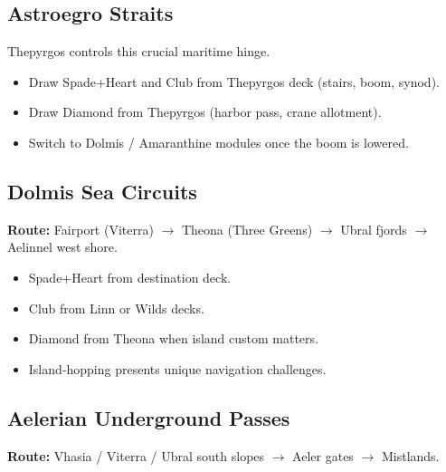 \subsection{Astroegro Straits}\label{subsec:astroegro_straits}

Thepyrgos controls this crucial maritime hinge.

\begin{itemize}
    \item Draw Spade+Heart and Club from Thepyrgos deck (stairs, boom, synod).
    \item Draw Diamond from Thepyrgos (harbor pass, crane allotment).
    \item Switch to Dolmis / Amaranthine modules once the boom is lowered.
\end{itemize}

\subsection{Dolmis Sea Circuits}\label{subsec:dolmis_circuits}

\textbf{Route:} Fairport (Viterra) $\rightarrow$ Theona (Three Greens) $\rightarrow$ Ubral fjords $\rightarrow$ Aelinnel west shore.

\begin{itemize}
    \item Spade+Heart from destination deck.
    \item Club from Linn or Wilds decks.
    \item Diamond from Theona when island custom matters.
    \item Island‑hopping presents unique navigation challenges.
\end{itemize}

\subsection{Aelerian Underground Passes}\label{subsec:aelerian_passes}

\textbf{Route:} Vhasia / Viterra / Ubral south slopes $\rightarrow$ Aeler gates $\rightarrow$ Mistlands.

